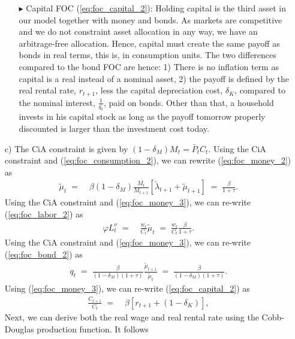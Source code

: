 \documentclass[a4paper, 12pt]{article}
\begin{document}
\begin{Answer}
\begin{small}
\begin{enumerate}
\begin{itemize}
				\item[$\blacktriangleright$] Capital FOC (\ref{eq:foc_capital_2}): Holding capital is the third asset in our model together with money and bonds. As markets are competitive and we do not constraint asset allocation in any way, we have an arbitrage-free allocation. Hence, capital must create the same payoff as bonds in real terms, this is, in consumption units. The two differences compared to the bond FOC are hence: 1) There is no inflation term as capital is a real instead of a nominal asset, 2) the payoff is defined by the real rental rate, $r_{t+1}$, less the capital depreciation cost, $\delta_K$, compared to the nominal interest, $\frac{1}{q_t}$, paid on bonds. Other than that, a household invests in his capital stock as long as the payoff tomorrow properly discounted is larger than the investment cost today.%
			\end{itemize}%
			\item[c) ] The CiA constraint is given by $(1-\delta_M) M_t = \bar{P}_t C_t$. Using the CiA constraint and (\ref{eq:foc_consumption_2}), we can rewrite (\ref{eq:foc_money_2}) as%
			\begin{align}%
				\tilde{\mu}_t \; = & \; \beta \left(1-\delta_M\right) \frac{M_t}{M_{t+1}} \left[\tilde{\lambda}_{t+1}+\tilde{\mu}_{t+1}\right] \; = \; \frac{\beta}{1+\tau}.\label{eq:foc_money_3}%
			\end{align}%
			Using the CiA constraint and (\ref{eq:foc_money_3}), we can re-write (\ref{eq:foc_labor_2}) as%
			\begin{align}%
				\varphi L_t^\nu \; = & \; \frac{w_t}{C_t} \tilde{\mu}_t \; = \; \frac{w_t}{C_t} \frac{\beta}{1+\tau}.\label{eq:foc_labor_3}%
			\end{align}%
			Using the CiA constraint and (\ref{eq:foc_money_3}), we can re-write (\ref{eq:foc_bond_2}) as%
			\begin{align}%
				q_t \; = \; \frac{\beta}{(1-\delta_M)(1+\tau)} \frac{\tilde{\mu}_{t+1}}{\tilde{\mu}_t} \; = \; \frac{\beta}{(1-\delta_M)(1+\tau)}.\label{eq:foc_bond_3}%
			\end{align}%
			Using (\ref{eq:foc_money_3}), we can re-write (\ref{eq:foc_capital_2}) as%
			\begin{align}%
				\frac{C_{t+1}}{C_t} \; = & \; \beta \left[ r_{t+1} + (1-\delta_K) \right],\label{eq:foc_capital_3}%
			\end{align}%
			Next, we can derive both the real wage and real rental rate using the Cobb-Douglas production function. It follows%
			\begin{align*}%

\end{align*}
\end{enumerate}
\end{small}
\end{Answer}
\end{document}
